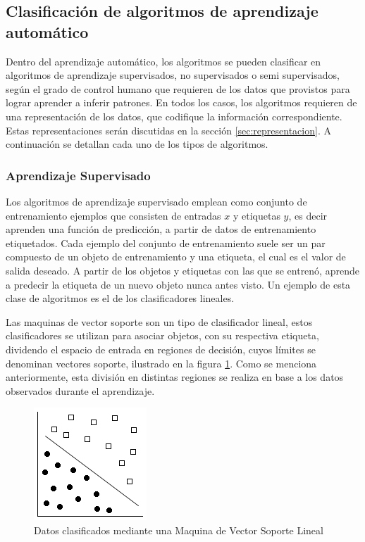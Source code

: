 \documentclass[a4paper,11pt,spanish]{book}
\begin{document}
      
    \subsection{Clasificación de algoritmos de aprendizaje automático}
      Dentro del aprendizaje automático, los algoritmos se pueden clasificar en algoritmos de aprendizaje supervisados, no supervisados o semi supervisados,
      según el grado de control humano que requieren de los datos que provistos para lograr aprender a inferir patrones. 
      En todos los casos, los algoritmos requieren de una representación de los datos, que codifique la información correspondiente. 
      Estas representaciones serán discutidas en la sección \ref{sec:representacion}.
      A continuación se detallan cada uno de los tipos de algoritmos.
      
      \subsubsection{Aprendizaje Supervisado} \label{sec:supervisado}
	Los algoritmos de aprendizaje supervisado emplean como conjunto de entrenamiento ejemplos que consisten de entradas $x$ y etiquetas $y$, es decir
	aprenden una función de predicción, a partir de datos de entrenamiento etiquetados. 
	Cada ejemplo del conjunto de entrenamiento suele ser un par compuesto de un objeto de entrenamiento y una etiqueta, el cual es el valor de salida deseado.
	A partir de los objetos y etiquetas con las que se entrenó, aprende a predecir la etiqueta de un nuevo objeto nunca antes visto. 
	Un ejemplo de esta clase de algoritmos es el de	los clasificadores lineales.

	Las maquinas de vector soporte son un tipo de clasificador lineal, estos clasificadores se utilizan para asociar objetos, con su respectiva etiqueta, 
	dividendo el espacio de entrada en regiones de decisión, cuyos límites se denominan vectores soporte, ilustrado en la figura \ref{fig:svm}.
	Como se menciona anteriormente, esta división en distintas regiones se realiza en base a los datos observados durante el aprendizaje.

	\begin{figure}[H]
	  \includegraphics[scale=0.5]{./img/linear_svm.png}
	  \caption{Datos clasificados mediante una Maquina de Vector Soporte Lineal}
	  \label{fig:svm}
	\end{figure}
\end{document}
